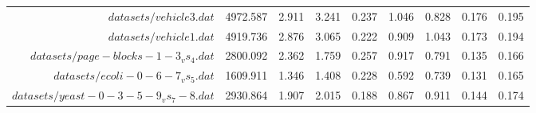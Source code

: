 \begin{table}[!ht]
{\begin{tabular}{r c c c c c c c c}
$datasets/vehicle3.dat$ & 4972.587 & 2.911 & 3.241 & 0.237 & 1.046 & 0.828 & 0.176 & 0.195 \\
$datasets/vehicle1.dat$ & 4919.736 & 2.876 & 3.065 & 0.222 & 0.909 & 1.043 & 0.173 & 0.194 \\
$datasets/page-blocks-1-3_vs_4.dat$ & 2800.092 & 2.362 & 1.759 & 0.257 & 0.917 & 0.791 & 0.135 & 0.166 \\
$datasets/ecoli-0-6-7_vs_5.dat$ & 1609.911 & 1.346 & 1.408 & 0.228 & 0.592 & 0.739 & 0.131 & 0.165 \\
$datasets/yeast-0-3-5-9_vs_7-8.dat$ & 2930.864 & 1.907 & 2.015 & 0.188 & 0.867 & 0.911 & 0.144 & 0.174 \\
\end{tabular}}
\end{table}
